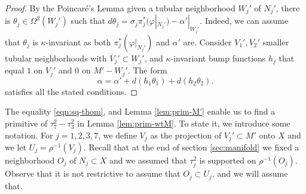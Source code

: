 \documentclass[10pt]{article}
\theoremstyle{plain}
\theoremstyle{definition}
\theoremstyle{remark}
\begin{document}
\begin{proof}
By the Poincaré's Lemma given a tubular neighborhood $W_j'$ of $N_j'$, there is $\theta_j\in \Omega^2(W_j')$
such that $d\theta_j= \sigma_j \pi_j^*(\varphi|_{N_j'}) - \alpha'|_{W_j'}$. 
Indeed, we can assume that $\theta_j$ is $\kappa$-invariant as both $\pi_j^*(\varphi|_{N_j'})$ and $\alpha'$ are. Consider $V_1',V_2'$ smaller tubular neighborhoods with $\overline{V}_j'\subset W_j'$, and $\kappa$-invariant bump functions $h_j$ that equal $1$ on $V_j'$ and $0$ on $M'-W_j'$. The form
$$
\alpha= \alpha' + d(h_1\theta_1) + d(h_2\theta_2).
$$
satisfies all the stated conditions.
\end{proof}

The equality \eqref{eqn:sq-thom}, and Lemma \ref{lem:prim-M'} enable us to 
find a primitive of $\tau_7^2-\tau_3^2$ in Lemma \ref{lem:prim-wtM}. To state it, we introduce some notation. For $j=1,2,3,7$, we define $V_j$ as the projection of $V_j'\subset M'$ onto $X$ and we let $U_j=\rho^{-1}(V_j)$. Recall that at the end of section \ref{sec:manifold} we fixed a neighborhood $O_j$ of $N_j\subset X$ and we assumed that $\tau_j^2$ is supported on $\rho^{-1}(O_j)$. Observe that it is not
restrictive to assume that $O_j \subset U_j$, and we will assume that. 
\end{document}
